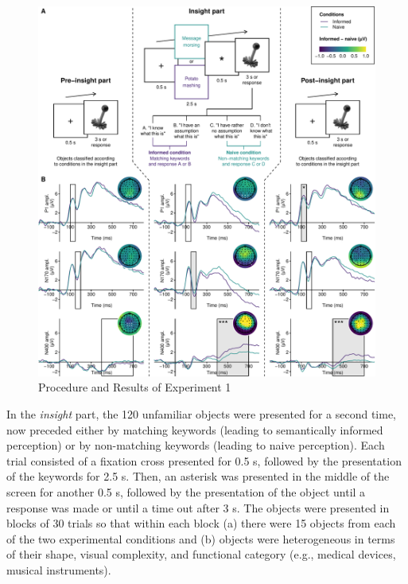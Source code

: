 \documentclass[
  english,
  man,floatsintext]{apa7}
\begin{document}
\begin{figure}

{\centering \includegraphics[width=1\linewidth]{manuscript_files/figure-latex/exp1-plot-1} 

}

\caption{Procedure and Results of Experiment 1\smallskip}\label{fig:exp1-plot}
\end{figure}



In the \emph{insight} part, the 120 unfamiliar objects were presented for a second time, now preceded either by matching keywords (leading to semantically informed perception) or by non-matching keywords (leading to naive perception). Each trial consisted of a fixation cross presented for 0.5 s, followed by the presentation of the keywords for 2.5 s. Then, an asterisk was presented in the middle of the screen for another 0.5 s, followed by the presentation of the object until a response was made or until a time out after 3 s. The objects were presented in blocks of 30 trials so that within each block (a) there were 15 objects from each of the two experimental conditions and (b) objects were heterogeneous in terms of their shape, visual complexity, and functional category (e.g., medical devices, musical instruments).
\end{document}
